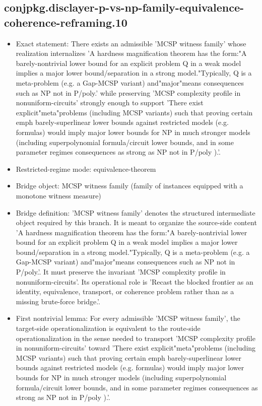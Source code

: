 \documentclass[11pt]{article}
\begin{document}
\subsection*{conjpkg.disclayer-p-vs-np-family-equivalence-coherence-reframing.10}
\begin{itemize}
\item Exact statement: There exists an admissible 'MCSP witness family' whose realization internalizes 'A hardness magnification theorem has the form:"A barely-nontrivial lower bound for an explicit problem Q in a weak model implies a major lower bound/separation in a strong model."Typically, Q is a meta-problem (e.g. a Gap-MCSP variant) and"major"means consequences such as NP not in P/poly.' while preserving 'MCSP complexity profile in nonuniform-circuits' strongly enough to support 'There exist explicit"meta"problems (including MCSP variants) such that proving certain emph barely-superlinear lower bounds against restricted models (e.g. formulas) would imply major lower bounds for NP in much stronger models (including superpolynomial formula/circuit lower bounds, and in some parameter regimes consequences as strong as NP not in P/poly ).'.
\item Restricted-regime mode: equivalence-theorem
\item Bridge object: MCSP witness family (family of instances equipped with a monotone witness measure)
\item Bridge definition: 'MCSP witness family' denotes the structured intermediate object required by this branch. It is meant to organize the source-side content 'A hardness magnification theorem has the form:"A barely-nontrivial lower bound for an explicit problem Q in a weak model implies a major lower bound/separation in a strong model."Typically, Q is a meta-problem (e.g. a Gap-MCSP variant) and"major"means consequences such as NP not in P/poly.'. It must preserve the invariant 'MCSP complexity profile in nonuniform-circuits'. Its operational role is 'Recast the blocked frontier as an identity, equivalence, transport, or coherence problem rather than as a missing brute-force bridge.'.
\item First nontrivial lemma: For every admissible 'MCSP witness family', the target-side operationalization is equivalent to the route-side operationalization in the sense needed to transport 'MCSP complexity profile in nonuniform-circuits' toward 'There exist explicit"meta"problems (including MCSP variants) such that proving certain emph barely-superlinear lower bounds against restricted models (e.g. formulas) would imply major lower bounds for NP in much stronger models (including superpolynomial formula/circuit lower bounds, and in some parameter regimes consequences as strong as NP not in P/poly ).'.

\end{itemize}
\end{document}
